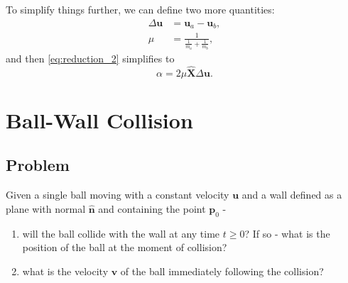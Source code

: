 \documentclass{article}
\renewcommand{\vec}[1]{\bm{#1}}
\newcommand{\bhat}[1]{\bm{\hat{#1}}}
\begin{document}
\begin{enumerate}
        To simplify things further, we can define two more quantities:
        \begin{align}
            \Delta \vec{u} &= \vec{u}_{a}-\vec{u}_{b},\\
            \mu &= \frac{1}{\frac{1}{m_{a}}+\frac{1}{m_{b}}},
            \label{eq:simplifications_1}
        \end{align}
        and then \autoref{eq:reduction_2} simplifies to
        \begin{equation}
            \alpha = 2\mu\bhat{X}\Delta\vec{u}.
            \label{eq:simplifications_2}
        \end{equation}
\end{enumerate}

\section{Ball-Wall Collision}
\subsection{Problem}
Given a single ball moving with a constant velocity $\vec{u}$ and a wall defined as a plane with normal $\bhat{n}$ and containing the point $\vec{p}_{0}$ -

\begin{enumerate}
    \item will the ball collide with the wall at any time $t\geq0$? If so - what is the position of the ball at the moment of collision?
    \item what is the velocity $\vec{v}$ of the ball immediately following the collision?
\end{enumerate}
\end{document}
